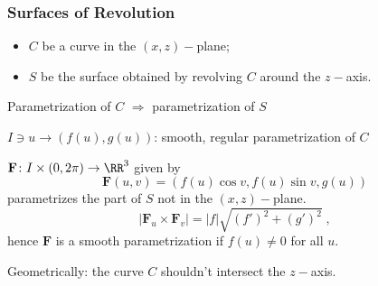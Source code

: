 \begin{frame}
  \frametitle{Surfaces of Revolution}

\begin{itemize}
  \item $C$ be a curve in the $(x,z)-$plane;
  \item $S$ be the surface obtained by revolving $C$ around the $z-$axis.
\end{itemize}

\begin{center}
  Parametrization of $C$ $\Longrightarrow$ parametrization of $S$
\end{center}

\pause
$I \ni u\to (f(u),g(u))$: smooth, regular parametrization of $C$

\pause
$\textbf{F} \colon I \times (0,2\pi) \to \RR^3$ given by
%
$$\textbf{F}(u,v) = (f(u)\cos{v}, f(u)\sin{v}, g(u))$$
%
parametrizes the part of $S$ not in the $(x,z)-$plane. \pause
%
$$|\textbf{F}_u \times \textbf{F}_v| = |f|\sqrt{(f')^2+(g')^2}\; ,$$
%
hence $\textbf{F}$ is a smooth parametrization if $f(u) \neq 0$ for all $u$.

\pause
Geometrically: the curve $C$ shouldn't intersect the $z-$axis.
\end{frame}